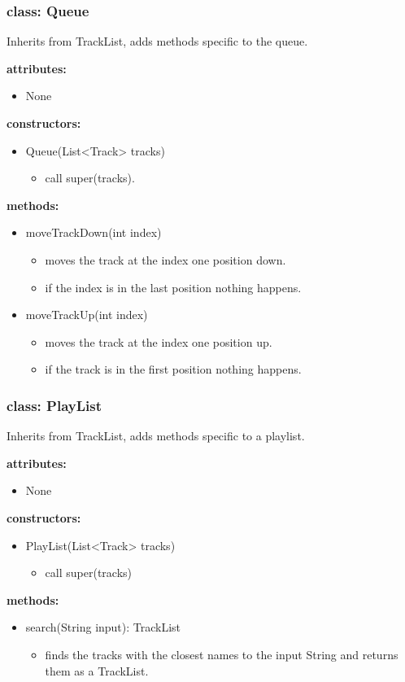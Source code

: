 \documentclass[oneside, ngerman]{sdqtechreport}
\begin{document}
\subsubsection{class: Queue}
Inherits from TrackList, adds methods specific to the queue.

\textbf{attributes:}
\begin{itemize}
    \item None
\end{itemize}
\textbf{constructors:}
\begin{itemize}
    \item Queue(List<Track> tracks)
    \begin{itemize}
        \item call super(tracks).
    \end{itemize}
\end{itemize}
\textbf{methods:}
\begin{itemize}
    \item moveTrackDown(int  index)
    \begin{itemize}
        \item moves the track at the index one position down.
        \item if the index is in the last position nothing happens.
    \end{itemize}
    \item moveTrackUp(int index)
    \begin{itemize}
        \item moves the track at the index one position up.
        \item if the track is in the first position nothing happens.
    \end{itemize}
\end{itemize}

\subsubsection{class: PlayList}
Inherits from TrackList, adds methods specific to a playlist.

\textbf{attributes:}
\begin{itemize}
    \item None
\end{itemize}
\textbf{constructors:}
\begin{itemize}
    \item PlayList(List<Track> tracks)
    \begin{itemize}
        \item call super(tracks)
    \end{itemize}
\end{itemize}
\textbf{methods:}
\begin{itemize}
    \item search(String input): TrackList
    \begin{itemize}
        \item finds the tracks with the closest names to the input String and returns them as a TrackList.
    \end{itemize}
\end{itemize}
\end{document}
